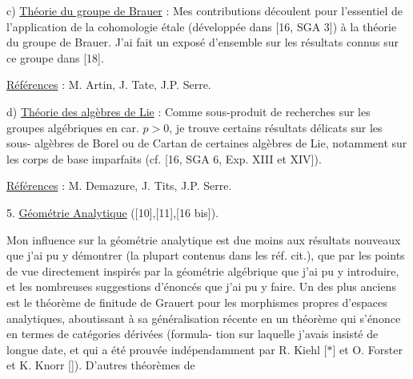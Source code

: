 
c) \uline{Théorie du groupe de Brauer} : Mes contributions
découlent pour l'essentiel de l'application de la
cohomologie étale (développée dans [16, SGA 3]) à la
théorie du groupe de Brauer. J'ai fait un exposé
d'ensemble sur les résultats connus sur ce groupe
dans [18].

\uline{Références} : M. Artin, J. Tate, J.P. Serre.

d) \uline{Théorie des algèbres de Lie} : Comme sous-produit
de recherches sur les groupes algébriques en car. $p > 0$,
je trouve certains résultats délicats sur les sous-%
algèbres de Borel ou de Cartan de certaines algèbres
de Lie, notamment sur les corps de base imparfaits
(cf. [16, SGA 6, Exp. XIII et XIV]).

\uline{Références} : M. Demazure, J. Tits, J.P. Serre.

5. \uline{Géométrie Analytique} ([10],[11],[16 bis]).

Mon influence sur la géométrie analytique
est due moins aux résultats nouveaux que j'ai pu y
démontrer (la plupart contenus dans les réf. cit.),
que par les points de vue directement inspirés par la
géométrie algébrique que j'ai pu y introduire, et les
nombreuses suggestions d'énoncés que j'ai pu y faire.
Un des plus anciens est le théorème de finitude de
Grauert pour les morphismes propres d'espaces analytiques,
aboutissant à sa généralisation récente en un théorème
qui s'énonce en termes de catégories dérivées (formula-%
tion sur laquelle j'avais insisté de longue date,
et qui a été prouvée indépendamment par R. Kiehl [$*$]
et O. Forster et K. Knorr [\unsure{$*$|$+$}]). D'autres théorèmes de

